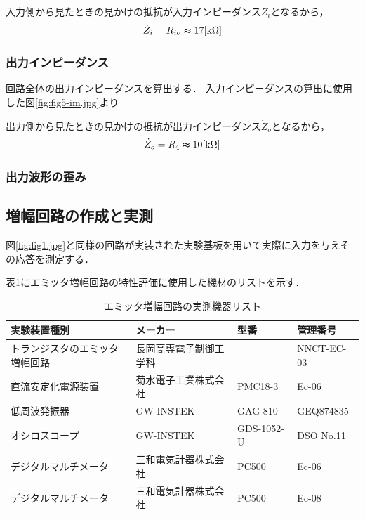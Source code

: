 \documentclass[dvipdfmx,titlepage,a4j]{jsarticle}  %
\numberwithin{equation}{section}
\begin{document}
入力側から見たときの見かけの抵抗が入力インピーダンス$\dot{Z}_i$となるから，
\begin{equation}
  \dot{Z}_i = R_{io} \thickapprox 17 \mathrm{[k \Omega]}
\end{equation}

\subsubsection{出力インピーダンス}
回路全体の出力インピーダンスを算出する．
入力インピーダンスの算出に使用した図\ref{fig:fig5-im.jpg}より

出力側から見たときの見かけの抵抗が出力インピーダンス$\dot{Z}_o$となるから，
\begin{equation}
  \dot{Z}_o = R_4 \thickapprox 10 \mathrm{[k \Omega]}
\end{equation}

\subsubsection{出力波形の歪み}

\subsection{増幅回路の作成と実測}
図\ref{fig:fig1.jpg}と同様の回路が実装された実験基板を用いて実際に入力を与えその応答を測定する．

表\ref{tbl:tr-list}にエミッタ増幅回路の特性評価に使用した機材のリストを示す．

\begin{table}[H]
  \caption{エミッタ増幅回路の実測機器リスト}
  \centering
  \begin{tabular}{l|l|l|l}
    \hline
    実験装置種別                   & メーカー               & 型番       & 管理番号   \\ \hline\hline
    トランジスタのエミッタ増幅回路 & 長岡高専電子制御工学科 &            & NNCT-EC-03 \\ \hline
    直流安定化電源装置             & 菊水電子工業株式会社   & PMC18-3    & Ec-06      \\ \hline
    低周波発振器                   & GW-INSTEK              & GAG-810    & GEQ874835  \\ \hline
    オシロスコープ                 & GW-INSTEK              & GDS-1052-U & DSO No.11  \\ \hline
    デジタルマルチメータ           & 三和電気計器株式会社   & PC500      & Ec-06      \\ \hline
    デジタルマルチメータ           & 三和電気計器株式会社   & PC500      & Ec-08      \\ \hline
  \end{tabular}
  \label{tbl:tr-list}
\end{table}
\end{document}
